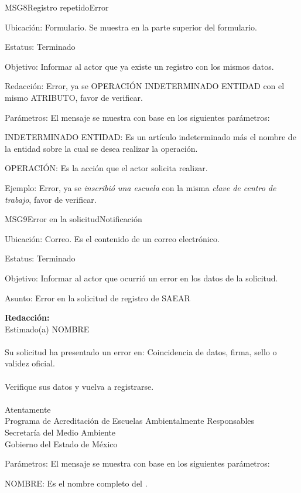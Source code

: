 \begin{mensaje}{MSG8}{Registro repetido}{Error}
    \item[Ubicación:] Formulario. Se muestra en la parte superior del formulario.
    \item[Estatus:] Terminado
    \item[Objetivo:] Informar al actor que ya existe un registro con los mismos datos.
    \item[Redacción:] Error, ya se OPERACIÓN INDETERMINADO ENTIDAD con el mismo ATRIBUTO, favor de verificar.
    \item[Parámetros:] El mensaje se muestra con base en los siguientes parámetros:
    \begin{Citemize}
	\item INDETERMINADO ENTIDAD: Es un artículo indeterminado más el nombre de la entidad sobre la cual se desea realizar la operación.
	\item OPERACIÓN: Es la acción que el actor solicita realizar.
    \end{Citemize}
    \item[Ejemplo:] Error, ya se {\em inscribió una escuela} con la misma {\em clave de centro de trabajo}, favor de verificar.
\end{mensaje}

\begin{mensaje}{MSG9}{Error en la solicitud}{Notificación}
	\item[Ubicación:] Correo. Es el contenido de un correo electrónico.
	\item[Estatus:] Terminado
	\item[Objetivo:] Informar al actor que ocurrió un error en los datos de la solicitud.
	\item[Asunto:] Error en la solicitud de registro de SAEAR
	\item[]{\bf Redacción:}\\
			  Estimado(a) NOMBRE\\ \\
			  Su solicitud ha presentado un error en: Coincidencia de datos, firma, sello o validez oficial.\\ \\
			  Verifique sus datos y vuelva a registrarse.   \\ \\
			  Atentamente\\
			  Programa de Acreditación de Escuelas Ambientalmente Responsables\\
			  Secretaría del Medio Ambiente\\
			  Gobierno del Estado de México\\
	\item[Parámetros:] El mensaje se muestra con base en los siguientes parámetros:
	\begin{Citemize}
		\item NOMBRE: Es el nombre completo del .
	\end{Citemize}
\end{mensaje}

